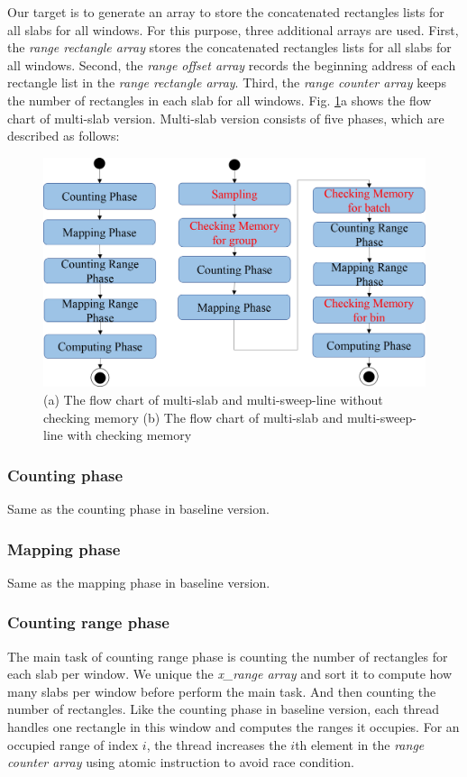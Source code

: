 Our target is to generate an array to store the concatenated rectangles lists for all slabs for all windows. For this purpose, three additional arrays are used. First, the \textit{range rectangle array} stores the concatenated rectangles lists for all slabs for all windows. Second, the \textit{range offset array} records the beginning address of each rectangle list in the \textit{range rectangle array}. Third, the \textit{range counter array} keeps the number of rectangles in each slab for all windows. Fig. \ref{fig:fig_3_5}a shows the flow chart of multi-slab version. Multi-slab version consists of five phases, which are described as follows:
\begin{figure}[h]
    \centering
    \includegraphics[scale=0.4]{image/fig_3_5}
    \caption{(a) The flow chart of multi-slab and multi-sweep-line without checking memory (b) The flow chart of multi-slab and multi-sweep-line with checking memory}
    \label{fig:fig_3_5}
\end{figure}

\subsubsection{Counting phase}
Same as the counting phase in baseline version.

\subsubsection{Mapping phase}
Same as the mapping phase in baseline version.

\subsubsection{Counting range phase}
The main task of counting range phase is counting the number of rectangles for each slab per window. We unique the \textit{x\_range array} and sort it to compute how many slabs per window before perform the main task. And then counting the number of rectangles. Like the counting phase in baseline version, each thread handles one rectangle in this window and computes the ranges it occupies. For an occupied range of index $i$, the thread increases the $i$th element in the \textit{range counter array} using atomic instruction to avoid race condition.


